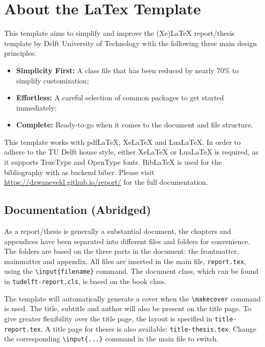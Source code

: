 \chapter{About the LaTex Template}

This template aims to simplify and improve the (Xe)LaTeX report/thesis template by Delft University of Technology with the following three main design principles:

\begin{itemize}
  \item \textbf{Simplicity First:} A class file that has been reduced by nearly 70\% to simplify customization;
  \item \textbf{Effortless:} A careful selection of common packages to get started immediately;
  \item \textbf{Complete:} Ready-to-go when it comes to the document and file structure.
\end{itemize}

\noindent This template works with pdfLaTeX, XeLaTeX and LuaLaTeX. In order to adhere to the TU Delft house style, either XeLaTeX or LuaLaTeX is required, as it supports TrueType and OpenType fonts. BibLaTeX is used for the bibliography with as backend biber. Please visit \url{https://dzwaneveld.github.io/report/} for the full documentation.

\section*{Documentation (Abridged)}

As a report/thesis is generally a substantial document, the chapters and appendices have been separated into different files and folders for convenience. The folders are based on the three parts in the document: the frontmatter, mainmatter and appendix. All files are inserted in the main file, \texttt{report.tex}, using the \texttt{\textbackslash input\{filename\}} command. The document class, which can be found in \texttt{tudelft-report.cls}, is based on the book class. 

The template will automatically generate a cover when the \texttt{\textbackslash makecover} command is used. The title, subtitle and author will also be present on the title page. To give greater flexibility over the title page, the layout is specified in \texttt{title-report.tex}. A title page for theses is also available: \texttt{title-thesis.tex}. Change the corresponding \texttt{\textbackslash input\{...\}} command in the main file to switch. 

